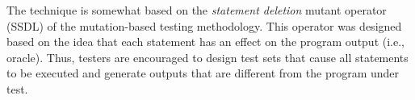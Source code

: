 \documentclass{article}
\begin{document}
%
%
%
%
%

The \cs{} technique is somewhat based on the \textit{statement deletion} mutant
operator (SSDL) of the mutation-based testing methodology. This operator
was designed based on the idea that each statement has an effect on the program
output (i.e., oracle). Thus, testers are encouraged to design test sets that cause
all statements to be executed and generate outputs that are different from the
program under test.
\end{document}
